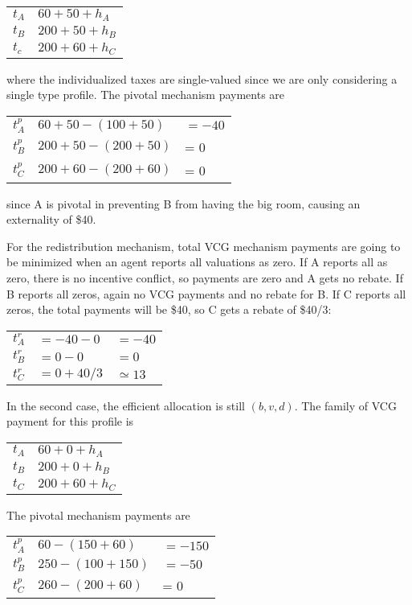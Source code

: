 \documentclass[letter, 10pt]{article}
\theoremstyle{definition}
\begin{document}
\begin{spacing}{1.1}
\begin{enumerate}
  \begin{tabular}{ll}
    $t_A$ & $60 + 50 + h_A$ \\
    $t_B$ & $200 + 50 + h_B$ \\
    $t_c$ & $200 + 60 + h_C$
  \end{tabular}

  where the individualized taxes are single-valued since we are only
  considering a single type profile. The pivotal mechanism payments are

  \begin{tabular}{lll}
    $t_A^p$ & $60 + 50  - (100 + 50)$ & $= -40$ \\
    $t_B^p$ & $200 + 50 - (200 + 50)$ &= 0 \\
    $t_C^p$ & $200 + 60 - (200 + 60)$ &= 0
  \end{tabular}

  since A is pivotal in preventing B from having the big room, causing an
  externality of \$40.

  For the redistribution mechanism, total VCG mechanism payments are going
  to be minimized when an agent reports all valuations as zero. If A
  reports all as zero, there is no incentive conflict, so payments are
  zero and A gets no rebate. If B reports all zeros, again no VCG payments
  and no rebate for B. If C reports all zeros, the total payments will
  be \$40, so C gets a rebate of \$40/3:

  \begin{tabular}{lll}
    $t_A^r$ & $= -40 - 0$ & $=-40$ \\
    $t_B^r$ & $= 0 - 0$ & $=0$ \\
    $t_C^r$ & $= 0 + 40/3$ & $\simeq 13$
  \end{tabular}

  In the second case, the efficient allocation is still $(b, v, d)$. The
  family of VCG payment for this profile is

  \begin{tabular}{ll}
    $t_A$ & $60 + 0 + h_A$ \\
    $t_B$ & $200 + 0 + h_B$ \\
    $t_C$ & $200 + 60 + h_C$
  \end{tabular}

  The pivotal mechanism payments are

  \begin{tabular}{lll}
    $t_A^p$ & $60 - (150 + 60)$ & $= -150$ \\
    $t_B^p$ & $250 - (100 + 150)$ & $= -50$ \\
    $t_C^p$ & $260 - (200 + 60)$ &= 0
  \end{tabular}


\end{enumerate}
\end{spacing}
\end{document}
